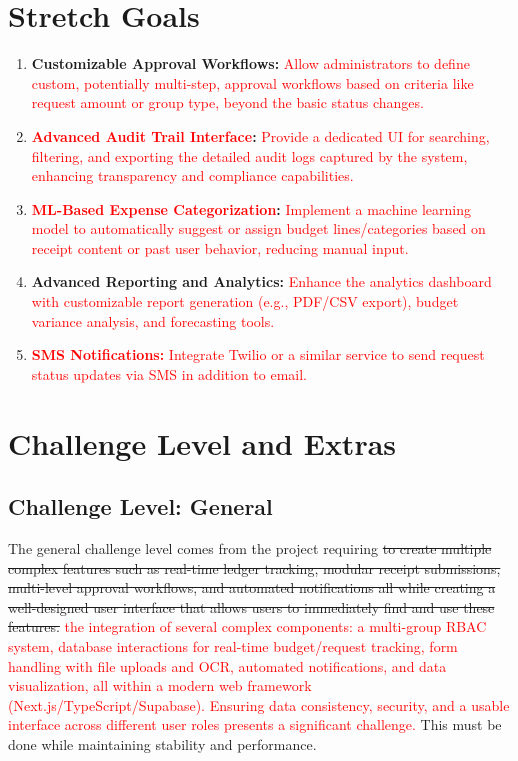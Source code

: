 \documentclass{article}
\begin{document}
\section{Stretch Goals} %

\begin{enumerate}
    \item \textbf{Customizable Approval Workflows:} \textcolor{red}{Allow administrators to define custom, potentially multi-step, approval workflows based on criteria like request amount or group type, beyond the basic status changes.}
    \item \textbf{\textcolor{red}{Advanced Audit Trail Interface}:} \textcolor{red}{Provide a dedicated UI for searching, filtering, and exporting the detailed audit logs captured by the system, enhancing transparency and compliance capabilities.}
    \item \textbf{\textcolor{red}{ML-Based Expense Categorization}:} \textcolor{red}{Implement a machine learning model to automatically suggest or assign budget lines/categories based on receipt content or past user behavior, reducing manual input.}
    \item \textbf{Advanced Reporting and Analytics:} \textcolor{red}{Enhance the analytics dashboard with customizable report generation (e.g., PDF/CSV export), budget variance analysis, and forecasting tools.}
    \item \textcolor{red}{\textbf{SMS Notifications:}} \textcolor{red}{Integrate Twilio or a similar service to send request status updates via SMS in addition to email.}
\end{enumerate}

\section{Challenge Level and Extras}
\subsection{Challenge Level: General}

\hspace{0.5cm}The general challenge level comes from the project requiring \sout{to create multiple complex features such as real-time ledger tracking, modular receipt submissions, multi-level approval workflows, and automated notifications all while creating a well-designed user interface that allows users to immediately find and use these features.} \textcolor{red}{the integration of several complex components: a multi-group RBAC system, database interactions for real-time budget/request tracking, form handling with file uploads and OCR, automated notifications, and data visualization, all within a modern web framework (Next.js/TypeScript/Supabase). Ensuring data consistency, security, and a usable interface across different user roles presents a significant challenge.} This must be done while maintaining stability and performance.
\end{document}
